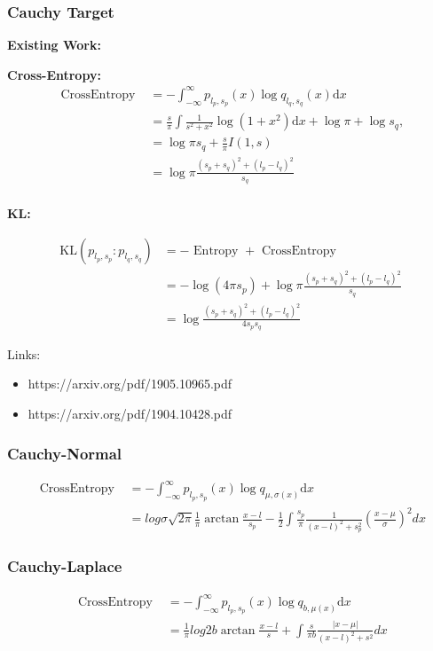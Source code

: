 \documentclass{article}
\begin{document}
\subsubsection{Cauchy Target}

\noindent \textbf{Existing Work:}

\noindent \textbf{Cross-Entropy:}
$$ \begin{aligned} \text { CrossEntropy }&=-\int_{-\infty}^{\infty} p_{l_{p}, s_{p}}(x) \log q_{l_{q}, s_{q}}(x) \mathrm{d} x\\& =\frac{s}{\pi} \int \frac{1}{s^{2}+x^{2}} \log \left(1+x^{2}\right) \mathrm{d} x+\log \pi+\log s_{q}, \\
&=\log \pi s_{q}+\frac{s}{\pi} I(1, s) \\
&=\log \pi \frac{\left(s_{p}+s_{q}\right)^{2}+\left(l_{p}-l_{q}\right)^{2}}{s_{q}}\\
\end{aligned} $$

\noindent \textbf{KL:}

$$ \begin{aligned}\mathrm{KL}\left(p_{l_{p}, s_{p}}: p_{l_{q}, s_{q}}\right)&=-\text { Entropy }+\text { CrossEntropy } \\&=-\log (4 \pi s_{p})+\log \pi \frac{\left(s_{p}+s_{q}\right)^{2}+\left(l_{p}-l_{q}\right)^{2}}{s_{q}}\\&=\log\frac{\left(s_{p}+s_{q}\right)^{2}+\left(l_{p}-l_{q}\right)^{2}}{4 s_{p} s_{q}}\end{aligned} $$

Links:
\begin{itemize}
    \item https://arxiv.org/pdf/1905.10965.pdf
    \item https://arxiv.org/pdf/1904.10428.pdf
\end{itemize}

\subsubsection{Cauchy-Normal}
$$ \begin{aligned} \text { CrossEntropy }&=
-\int_{-\infty}^{\infty} p_{l_{p}, s_{p}}(x) \log q_{\mu, \sigma(x)} \mathrm{d} x \\
&=log\sigma\sqrt{2\pi}\frac{1}{\pi}\arctan\frac{x-l}{s_{p}}  -\frac{1}{2} \int  \frac{s_{p} }{\pi}\frac{1}{(x-l)^{2}+s_{p}^{2}}(\frac{x-\mu}{\sigma} )^{2} dx
\end{aligned} $$

\subsubsection{Cauchy-Laplace}
$$
\begin{aligned} \text { CrossEntropy }&=
-\int_{-\infty}^{\infty} p_{l_{p}, s_{p}}(x) \log q_{b, \mu(x)} \mathrm{d} x \\
&=\frac{1}{\pi}log2b\arctan\frac{x-l}{s}  +\int \frac{s}{\pi b} \frac{\left | x-\mu \right | }{(x-l)^{2}+s^{2}}dx 
\end{aligned}$$
\end{document}
